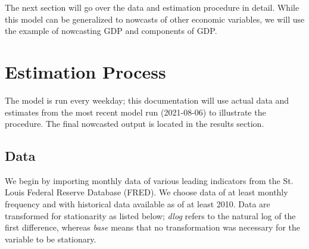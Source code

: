\documentclass[11pt, letterpaper]{article}\usepackage[]{graphicx}\usepackage[]{color}
\begin{document}
The next section will go over the data and estimation procedure in detail. While this model can be generalized to nowcasts of other economic variables, we will use the example of nowcasting GDP and components of GDP.

\newpage
\section{Estimation Process}
The model is run every weekday; this documentation will use actual data and estimates from the most recent model run (2021-08-06) to illustrate the procedure. The final nowcasted output is located in the results section.

\subsection{Data}
We begin by importing monthly data of various leading indicators from the St. Louis Federal Reserve Database (FRED). We choose data of at least monthly frequency and with historical data available as of at least 2010. Data are transformed for stationarity as listed below; \textit{dlog} refers to the natural log of the first difference, whereas \textit{base} means that no transformation was necessary for the variable to be stationary.
\end{document}

